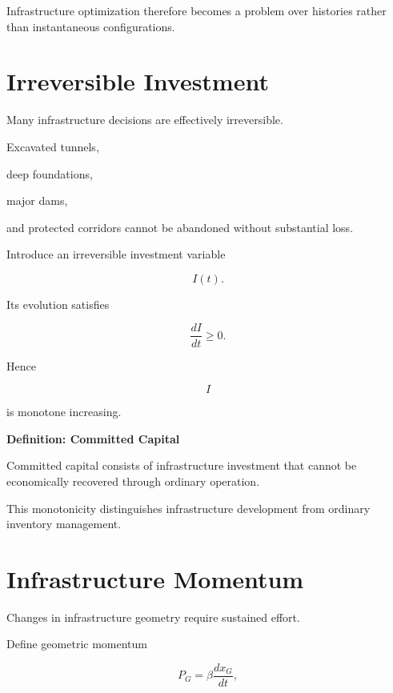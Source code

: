 \documentclass[11pt,fleqn]{book}
\numberwithin{equation}{chapter}
\newenvironment{definition}[1]
  {\begin{definitionEnv}
   \noindent\textbf{Definition: #1}\par\smallskip}
  {\end{definitionEnv}}
\theoremstyle{plain}
\theoremstyle{definition}
\theoremstyle{remark}
\begin{document}
Infrastructure optimization therefore becomes a problem over histories
rather than instantaneous configurations.


\section{Irreversible Investment}

Many infrastructure decisions are effectively irreversible.

Excavated tunnels,

deep foundations,

major dams,

and protected corridors cannot be abandoned without substantial loss.

Introduce an irreversible investment variable

\[
I(t).
\]

Its evolution satisfies

\[
\frac{dI}{dt}
\ge
0.
\]

Hence

\[
I
\]

is monotone increasing.


\begin{definition}{Committed Capital}

Committed capital consists of infrastructure investment that cannot be
economically recovered through ordinary operation.

\end{definition}


This monotonicity distinguishes infrastructure development from ordinary
inventory management.


\section{Infrastructure Momentum}

Changes in infrastructure geometry require sustained effort.

Define geometric momentum

\[
P_G
=
\beta
\frac{dx_G}{dt},
\]
\end{document}
